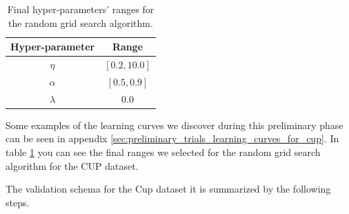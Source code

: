 \documentclass[11pt,twoside]{article}
\begin{document}
        \begin{table}[hbtp]
          \centering
          \begin{tabular}{| c | c |}
            \hline
            Hyper-parameter & Range \\
            \hline
            $\eta$ & $\left [ 0.2, 10.0 \right ]$ \\
            \hline
            $\alpha$ & $\left [ 0.5, 0.9 \right ]$ \\
            \hline
            $\lambda$ & $0.0$ \\
            \hline
            \end{tabular}
            \caption{Final hyper-parameters' ranges for the random grid search algorithm.}
            \label{tab:hyper_ranges}
        \end{table}
        Some examples of the learning curves we discover during this preliminary phase can be seen in appendix
        \ref{sec:preliminary_trials_learning_curves_for_cup}. In table \ref{tab:hyper_ranges} you can see the
        final ranges we selected for the random grid search algorithm for the CUP dataset.

\newpage        
The validation schema for the Cup dataset it is summarized by the following steps.
\end{document}
